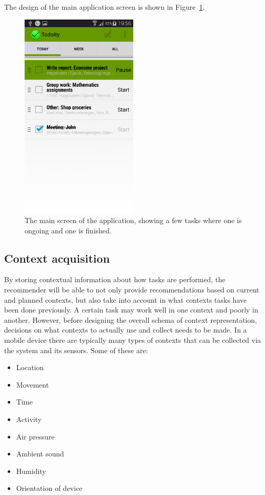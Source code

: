 The design of the main application screen is shown in Figure~\ref{fig:designmainscreen}.
\begin{figure}[tbp]
  \centering
  \includegraphics[width=0.5\textwidth]{figures/MainScreenStarted.png}
  \caption[Main application screen]{The main screen of the application, showing a few tasks where one is ongoing and one is finished.}
  \label{fig:designmainscreen}
\end{figure}


\subsection{Context acquisition}
By storing contextual information about how tasks are performed, the recommender will be able to not only provide recommendations based on current and planned contexts, but also take into account in what contexts tasks have been done previously. A certain task may work well in one context and poorly in another. However, before designing the overall schema of context representation, decisions on what contexts to actually use and collect needs to be made. In a mobile device there are typically many types of contexts that can be  collected via the system and its sensors. Some of these are:
\begin{itemize}
	\item Location
	\item Movement
	\item Time
	\item Activity
	\item Air pressure
	\item Ambient sound
	\item Humidity
	\item Orientation of device
\end{itemize}

